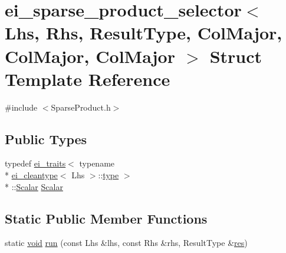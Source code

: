 \hypertarget{structei__sparse__product__selector_3_01_lhs_00_01_rhs_00_01_result_type_00_01_col_major_00_01_col_major_00_01_col_major_01_4}{\section{ei\-\_\-sparse\-\_\-product\-\_\-selector$<$ Lhs, Rhs, Result\-Type, Col\-Major, Col\-Major, Col\-Major $>$ Struct Template Reference}
\label{structei__sparse__product__selector_3_01_lhs_00_01_rhs_00_01_result_type_00_01_col_major_00_01_col_major_00_01_col_major_01_4}
}


{\ttfamily \#include $<$Sparse\-Product.\-h$>$}

\subsection*{Public Types}
\begin{DoxyCompactItemize}
\item 
typedef \hyperlink{structei__traits}{ei\-\_\-traits}$<$ typename \\*
\hyperlink{structei__cleantype}{ei\-\_\-cleantype}$<$ Lhs $>$\-::\hyperlink{glext_8h_a7d05960f4f1c1b11f3177dc963a45d86}{type} $>$\\*
\-::\hyperlink{structei__sparse__product__selector_3_01_lhs_00_01_rhs_00_01_result_type_00_01_col_major_00_01_col_major_00_01_col_major_01_4_a426dde0a2783cff130eac8e87b609f77}{Scalar} \hyperlink{structei__sparse__product__selector_3_01_lhs_00_01_rhs_00_01_result_type_00_01_col_major_00_01_col_major_00_01_col_major_01_4_a426dde0a2783cff130eac8e87b609f77}{Scalar}
\end{DoxyCompactItemize}
\subsection*{Static Public Member Functions}
\begin{DoxyCompactItemize}
\item 
static \hyperlink{group___u_a_v_objects_plugin_ga444cf2ff3f0ecbe028adce838d373f5c}{void} \hyperlink{structei__sparse__product__selector_3_01_lhs_00_01_rhs_00_01_result_type_00_01_col_major_00_01_col_major_00_01_col_major_01_4_a82759f5ed21101c2ef133708ef1e7eaa}{run} (const Lhs \&lhs, const Rhs \&rhs, Result\-Type \&\hyperlink{glext_8h_a1dbb21208b9047cc8031ca9c840d3c2f}{res})
\end{DoxyCompactItemize}


